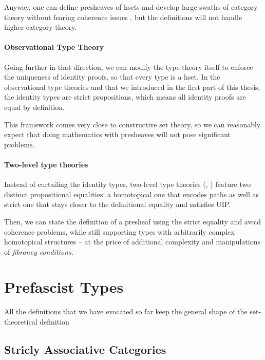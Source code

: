 Anyway, one can define presheaves of hsets and develop large swaths of category
theory without fearing coherence issues , but the definitions
will not handle higher category theory.

\paragraph{Observational Type Theory}
% 
Going further in that direction, we can modify the type theory itself to 
enforce the uniqueness of identity proofs, so that every type is a hset.
% 
In the observational type theories \SetoidTT and \SetoidCC that we introduced 
in the first part of this thesis, the identity types are strict propositions,
which means all identity proofs are equal by definition.

This framework comes very close to constructive set theory, so we can
reasonably expect that doing mathematics with presheaves will not pose 
significant problems.

\paragraph{Two-level type theories}
% 
Instead of curtailing the identity types, two-level type theories 
(, )
feature two distinct propositional equalities: a homotopical one that encodes 
paths as well as strict one that stays closer to the definitional equality and
satisfies UIP.

Then, we can state the definition of a presheaf using the strict equality
and avoid coherence problems, while still supporting types with arbitrarily
complex homotopical structures -- at the price of additional complexity
and manipulations of \emph{fibrancy conditions}.

\section{Prefascist Types}
% 
% 
All the definitions that we have evocated so far keep the general shape of the 
set-theoretical definition

\subsection{Stricly Associative Categories}

